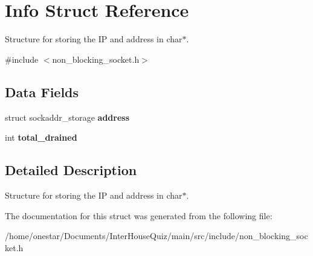 \hypertarget{struct_info}{\section{Info Struct Reference}
\label{struct_info}
}


Structure for storing the I\+P and address in char$\ast$.  




{\ttfamily \#include $<$non\+\_\+blocking\+\_\+socket.\+h$>$}

\subsection*{Data Fields}
\begin{DoxyCompactItemize}
\item 
\hypertarget{struct_info_aae8fde91ce26bf141fe1d113e5c895fb}{struct sockaddr\+\_\+storage {\bfseries address}}\label{struct_info_aae8fde91ce26bf141fe1d113e5c895fb}

\item 
\hypertarget{struct_info_ac2d591f6194e19f943a829b9009cc6d1}{int {\bfseries total\+\_\+drained}}\label{struct_info_ac2d591f6194e19f943a829b9009cc6d1}

\end{DoxyCompactItemize}


\subsection{Detailed Description}
Structure for storing the I\+P and address in char$\ast$. 

The documentation for this struct was generated from the following file\+:\begin{DoxyCompactItemize}
\item 
/home/onestar/\+Documents/\+Inter\+House\+Quiz/main/src/include/non\+\_\+blocking\+\_\+socket.\+h\end{DoxyCompactItemize}
